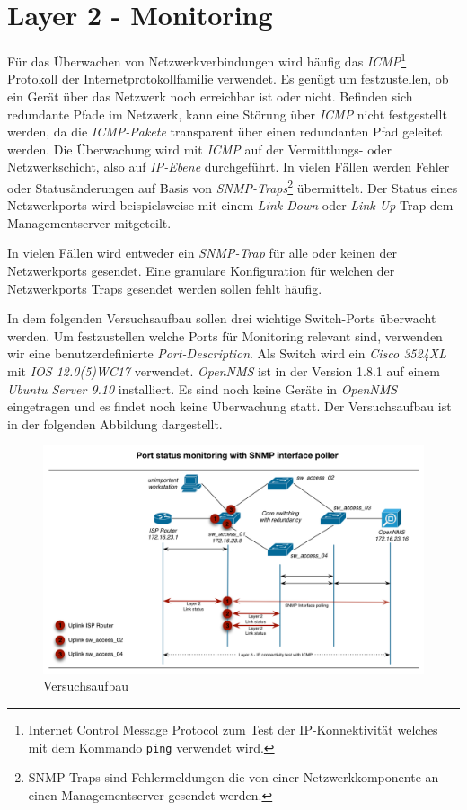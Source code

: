 \section{Layer 2 - Monitoring}
Für das Überwachen von Netzwerkverbindungen wird häufig das \textit{ICMP}\footnote{Internet Control Message Protocol zum Test der IP-Konnektivität welches mit dem Kommando \texttt{ping} verwendet wird.} Protokoll der Internetprotokollfamilie verwendet. Es genügt um festzustellen, ob ein Gerät über das Netzwerk noch erreichbar ist oder nicht. Befinden sich redundante Pfade im Netzwerk, kann eine Störung über \textit{ICMP} nicht festgestellt werden, da die \textit{ICMP-Pakete} transparent über einen redundanten Pfad geleitet werden. Die Überwachung wird mit \textit{ICMP} auf der Vermittlungs- oder Netzwerkschicht, also auf \textit{IP-Ebene} durchgeführt. In vielen Fällen werden Fehler oder Statusänderungen auf Basis von \textit{SNMP-Traps}\footnote{SNMP Traps sind Fehlermeldungen die von einer Netzwerkkomponente an einen Managementserver gesendet werden.} übermittelt. Der Status eines Netzwerkports wird beispielsweise mit einem  \textit{Link Down} oder \textit{Link Up} Trap dem Managementserver mitgeteilt.

In vielen Fällen wird entweder ein \textit{SNMP-Trap} für alle oder keinen der  Netzwerkports gesendet. Eine granulare Konfiguration für welchen der Netzwerkports Traps gesendet werden sollen fehlt häufig.

In dem folgenden Versuchsaufbau sollen drei wichtige Switch-Ports überwacht werden. Um festzustellen welche Ports für Monitoring relevant sind, verwenden wir eine benutzerdefinierte \textit{Port-Description}. Als Switch wird ein \textit{Cisco 3524XL} mit \textit{IOS 12.0(5)WC17} verwendet. \textit{OpenNMS} ist in der Version 1.8.1 auf einem \textit{Ubuntu Server 9.10} installiert. Es sind noch keine Geräte in \textit{OpenNMS} eingetragen und es findet noch keine Überwachung statt. Der Versuchsaufbau ist in der folgenden Abbildung dargestellt.

\begin{figure}[H]
	\centering
	\includegraphics[width=1.0\textwidth]{images/use-cases/monitoring-layer-2/lab-plan}
	\caption{Versuchsaufbau}
	\label{pic:lab}
\end{figure}

